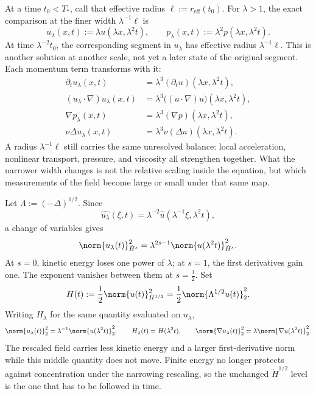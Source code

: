 
At a time \(t_0<T_*\), call that effective radius \(\ell:=r_{\mathrm{eff}}(t_0)\). For \(\lambda>1\), the exact \NavierStokes{} comparison at the finer width \(\lambda^{-1}\ell\) is
\[
  u_\lambda(x,t)
  :=
  \lambda u(\lambda x,\lambda^2t),
  \qquad
  p_\lambda(x,t)
  :=
  \lambda^2p(\lambda x,\lambda^2t).
\]
At time \(\lambda^{-2}t_0\), the corresponding segment in \(u_\lambda\) has effective radius \(\lambda^{-1}\ell\). This is another solution at another scale, not yet a later state of the original segment. Each momentum term transforms with it:
\[
\begin{aligned}
  \partial_tu_\lambda(x,t)
  &=
  \lambda^3(\partial_tu)(\lambda x,\lambda^2t),
  \\
  (u_\lambda\cdot\nabla)u_\lambda(x,t)
  &=
  \lambda^3\bigl((u\cdot\nabla)u\bigr)(\lambda x,\lambda^2t),
  \\
  \nabla p_\lambda(x,t)
  &=
  \lambda^3(\nabla p)(\lambda x,\lambda^2t),
  \\
  \nu\Delta u_\lambda(x,t)
  &=
  \lambda^3\nu(\Delta u)(\lambda x,\lambda^2t).
\end{aligned}
\]
A radius \(\lambda^{-1}\ell\) still carries the same unresolved balance: local acceleration, nonlinear transport, pressure, and viscosity all strengthen together. What the narrower width changes is not the relative scaling inside the equation, but which measurements of the field become large or small under that same map.


Let \(\Lambda:=(-\Delta)^{1/2}\). Since
\[
  \widehat{u_\lambda}(\xi,t)
  =
  \lambda^{-2}\widehat u(\lambda^{-1}\xi,\lambda^2t),
\]
a change of variables gives
\[
  \norm{u_\lambda(t)}_{\dot H^s}^2
  =
  \lambda^{2s-1}
  \norm{u(\lambda^2t)}_{\dot H^s}^2.
\]
At \(s=0\), kinetic energy loses one power of \(\lambda\); at \(s=1\), the first derivatives gain one. The exponent vanishes between them at \(s=\tfrac12\). Set
\[
  H(t)
  :=
  \frac12\norm{u(t)}_{\dot H^{1/2}}^2
  =
  \frac12\norm{\Lambda^{1/2}u(t)}_2^2.
\]
Writing \(H_\lambda\) for the same quantity evaluated on \(u_\lambda\),
\[
  \norm{u_\lambda(t)}_2^2
  =
  \lambda^{-1}\norm{u(\lambda^2t)}_2^2,
  \qquad
  H_\lambda(t)=H(\lambda^2t),
  \qquad
  \norm{\nabla u_\lambda(t)}_2^2
  =
  \lambda\norm{\nabla u(\lambda^2t)}_2^2.
\]
The rescaled field carries less kinetic energy and a larger first-derivative norm while this middle quantity does not move. Finite energy no longer protects against concentration under the narrowing rescaling, so the unchanged \(\dot H^{1/2}\) level is the one that has to be followed in time.

